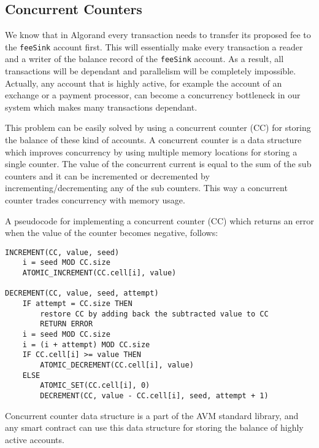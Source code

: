 \documentclass[11pt, A4]{report}
\begin{document}
    \subsection{Concurrent Counters}\label{subsec:concurrent-counters}

    We know that in Algorand every transaction needs to transfer its proposed fee to the \texttt{feeSink} account
    first. This will essentially make every transaction a reader and a writer of the balance record of the
    \texttt{feeSink} account. As a result, all transactions will be dependant and parallelism will be completely
    impossible. Actually, any account that is highly active, for example the account of an exchange or a payment
    processor, can become a concurrency bottleneck in our system which makes many transactions dependant.

    This problem can be easily solved by using a concurrent counter (CC) for storing the balance of these kind of
    accounts. A concurrent counter is a data structure which improves concurrency by using multiple memory locations for
    storing a single counter. The value of the concurrent current is equal to the sum of the sub counters and it can
    be incremented or decremented by incrementing/decrementing any of the sub counters. This way a concurrent
    counter trades concurrency with memory usage.

    A pseudocode for implementing a concurrent counter (CC) which returns an error when the value of the counter
    becomes negative, follows:

    \begin{samepage}
        \begin{verbatim}
INCREMENT(CC, value, seed)
    i = seed MOD CC.size
    ATOMIC_INCREMENT(CC.cell[i], value)

DECREMENT(CC, value, seed, attempt)
    IF attempt = CC.size THEN
        restore CC by adding back the subtracted value to CC
        RETURN ERROR
    i = seed MOD CC.size
    i = (i + attempt) MOD CC.size
    IF CC.cell[i] >= value THEN
        ATOMIC_DECREMENT(CC.cell[i], value)
    ELSE
        ATOMIC_SET(CC.cell[i], 0)
        DECREMENT(CC, value - CC.cell[i], seed, attempt + 1)
        \end{verbatim}
    \end{samepage}

    Concurrent counter data structure is a part of the AVM standard library, and any smart contract can use this data
    structure for storing the balance of highly active accounts.
\end{document}
